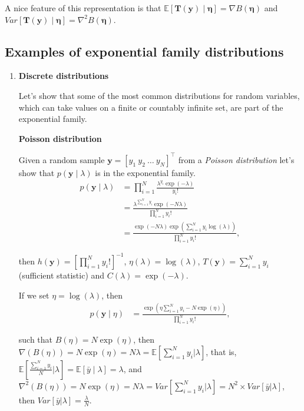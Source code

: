 A nice feature of this representation is that $\mathbb{E}[\bm{T}(\bm{y})\mid \bm{\eta}]=\nabla B(\bm{\eta})$ and $Var[\bm{T}(\bm{y})\mid \bm{\eta}]=\nabla^2 B(\bm{\eta})$. 

\subsection{Examples of exponential family distributions}

\begin{enumerate}

\item \textbf{Discrete distributions}

Let's show that some of the most common distributions for random variables, which can take values on a finite or countably infinite set, are part of the exponential family.
 
\textbf{Poisson distribution} 

Given a random sample $\bm{y}=[y_1 \ y_2 \ \dots \ y_N]^{\top}$ from a \textit{Poisson distribution} let's show that $p(\bm{y}\mid \lambda)$ is in the exponential family.
\begin{align}
	p(\bm{y}\mid \lambda)&=\prod_{i=1}^N \frac{\lambda^{y_i} \exp(-\lambda)}{y_i!}\nonumber\\
	&=\frac{\lambda^{\sum_{i=1}^N y_i}\exp(-N\lambda)}{\prod_{i=1}^N y_i!}\nonumber\\
	&=\frac{\exp(-N\lambda)\exp(\sum_{i=1}^Ny_i\log(\lambda))}{\prod_{i=1}^N y_i!}\nonumber,
\end{align}

then $h(\bm{y})=\left[\prod_{i=1}^N y_i!\right]^{-1}$, $\eta(\lambda)=\log(\lambda)$, $T(\bm{y})=\sum_{i=1}^N y_i$ (sufficient statistic) and $C(\lambda)=\exp(-\lambda)$.

If we set $\eta=\log(\lambda)$, then 
\begin{align}
	p(\bm{y}\mid \eta)&=\frac{\exp(\eta\sum_{i=1}^Ny_i-N\exp(\eta))}{\prod_{i=1}^N y_i!},\nonumber
\end{align}

such that $B(\eta)=N\exp(\eta)$, then $\nabla(B(\eta))=N\exp(\eta)=N\lambda=\mathbb{E}\left[\sum_{i=1}^N y_i\biggr\rvert\lambda\right]$, that is, $\mathbb{E}\left[\frac{\sum_{i=1}^N y_i}{N}\biggr\rvert\lambda\right]=\mathbb{E}[\bar{y}\mid \lambda]=\lambda$, and $\nabla^2(B(\eta))=N\exp(\eta)=N\lambda=Var\left[\sum_{i=1}^N y_i\biggr\rvert\lambda\right]=N^2 \times Var\left[\bar{y}\rvert\lambda\right]$, then $Var\left[\bar{y}\rvert\lambda\right]=\frac{\lambda}{N}$.\\ 


\end{enumerate}
